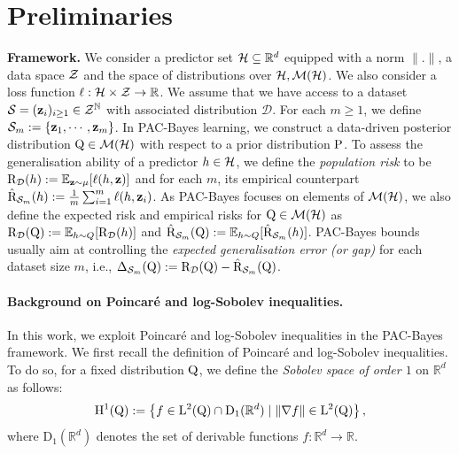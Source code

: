 \section{Preliminaries}

\textbf{Framework.}
We consider a predictor set $\Hcal\subseteq \mathbb{R}^d$ equipped with a norm $\|.\|$, a data space $\Zcal$ and the space of distributions over $\Hcal,\Mcal(\Hcal)$.
We also consider a loss function $\ell : \Hcal\times \Zcal \rightarrow \mathbb{R}$. 
We assume that we have access to a \iid dataset $\S=(\z_i)_{i\geq 1}\in\Zcal^\Nbb$  with associated distribution $\mathcal{D}$. For each $m\geq 1$, we define $\S_m:= \{\z_1,\cdots,\z_m\}$.
In PAC-Bayes learning, we construct a data-driven posterior distribution $\Q\in\Mcal(\Hcal)$ with respect to a prior distribution $\P$. 
To assess the generalisation ability of a predictor $h\in\Hcal$, we define  the \emph{population risk} to be $\Risk_{\D} (h) \defeq \EE_{\z\sim \mu}[\ell(h,\z)]$ and for each $m$, its empirical counterpart $\hat{\Risk}_{\S_m} (h) \defeq \frac{1}{m}\sum_{i=1}^{m} \ell(h,\z_{i})$. As PAC-Bayes focuses on elements of $\Mcal(\Hcal)$, we also define the expected risk and empirical risks for $\Q\in\Mcal(\Hcal)$ as $\Risk_{\D}(\Q):= \EE_{\h\sim Q}[ \Risk_{\D}(\h)]$ and $\hat{\Risk}_{\S_m}(\Q):= \EE_{\h\sim Q}[ \hat{\Risk}_{\S_m}(\h)]$.
PAC-Bayes bounds usually aim at controlling the \emph{expected generalisation error (or gap)} for each dataset size $m$, i.e.,  $\Delta_{\S_m}(\Q):=
\Risk_{\D}(\Q) - \hat{\Risk}_{\S_m}(\Q)$.

\paragraph{Background on Poincaré and log-Sobolev inequalities.} In this work, we exploit Poincaré and log-Sobolev inequalities in the PAC-Bayes framework.
We first recall the definition of Poincaré and log-Sobolev inequalities.
To do so, for a fixed distribution $\Q$, we define the \emph{Sobolev space of order $1$} on $\mathbb{R}^d$ as follows:
\[ \mathrm{H}^{1}(\Q) := \left\{ f\in \mathrm{L}^2(\Q)\cap \mathrm{D}_1(\mathbb{R}^d)\mid \|\nabla f\|\in \mathrm{L}^2(\Q) \right\}, \] 
where $\mathrm{D}_1(\mathbb{R}^d)$ denotes the set of derivable functions $f : \mathbb{R}^d \to \mathbb{R}$. 

